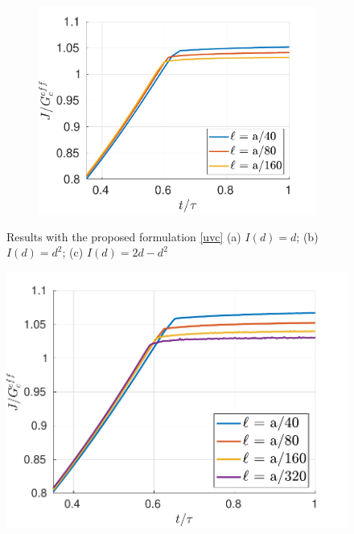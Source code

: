 \begin{figure}[h]
\begin{subfigure}{.33\textwidth}
  \includegraphics[width=\linewidth]{images/2d_propagation/zoom_gary_I_2d.pdf}
  \caption{}
  \label{fig:prop_gary_2d}
\end{subfigure}
  \caption{Results with the proposed formulation \eqref{uvc} (a) $I(d) = d$; (b) $I(d) = d^2$; (c) $I(d) = 2d-d^2$  } 
  \label{fig:prop_gary}
\end{figure}




\begin{figure}
  \centering
  \includegraphics[width=0.7\linewidth]{images/2d_propagation/zoom_fine_gary_I_d.pdf}
  \label{fig:refined_gary_I_d}
\end{figure}

